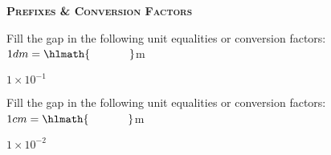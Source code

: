 \documentclass[main.tex]{subfiles}
\begin{document}
\begin{multicols*}{2}
{\raggedright\textsc{\textbf{Prefixes \& Conversion Factors }}\par}
\begin{question}[ID=\the\value{numA}]
Fill the gap in the following unit equalities or conversion factors:
$1dm=\hlmath{\hspace{35pt }}$m
\end{question}
\begin{solution}
$1\times 10^{-1}$
\hspace{0.1cm}\end{solution}%




\begin{question}[ID=\the\value{numA}]
Fill the gap in the following unit equalities or conversion factors:
$1cm=\hlmath{\hspace{35pt }}$m
\end{question}
\begin{solution}
$1\times 10^{-2}$
\hspace{0.1cm}\end{solution}%



\end{multicols*}
\end{document}
